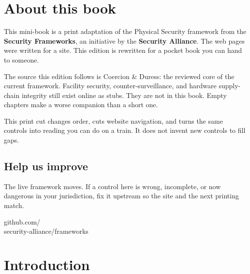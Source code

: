 \chapter{About this book}

This mini-book is a print adaptation of the Physical
Security framework from the \textbf{Security Frameworks},
an initiative by the \textbf{Security Alliance}. The web
pages were written for a site. This edition is rewritten
for a pocket book you can hand to someone.

The source this edition follows is Coercion \& Duress:
the reviewed core of the current framework. Facility
security, counter-surveillance, and hardware supply-chain
integrity still exist online as stubs. They are not in
this book. Empty chapters make a worse companion than a
short one.

This print cut changes order, cuts website navigation,
and turns the same controls into reading you can do on a
train. It does not invent new controls to fill gaps.

\section{Help us improve}

The live framework moves. If a control here is wrong,
incomplete, or now dangerous in your jurisdiction, fix it
upstream so the site and the next printing match.

{\ttfamily github.com/\\security-alliance/frameworks}



\chapter{Introduction}

